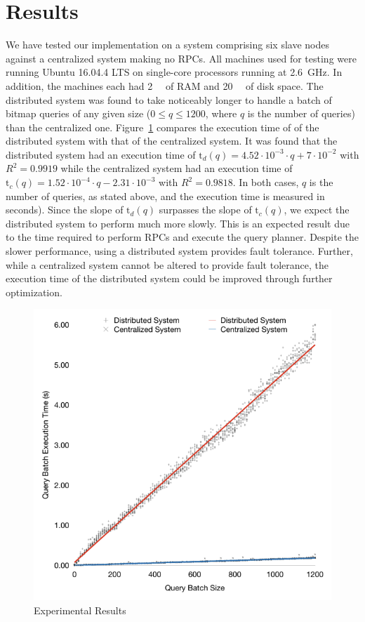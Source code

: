 \section{Results}
We have tested our implementation on a system comprising six slave nodes
against a centralized system making no RPCs. All machines used for testing were
running Ubuntu 16.04.4 LTS on single-core processors running at
\SI{2.6}{\giga\hertz}. In addition, the machines each had \SI{2}{\gibi\byte}
of RAM and \SI{20}{\gibi\byte} of disk space. The distributed system was found
to take noticeably longer to handle a batch of bitmap queries of any given size
(\(0 \leq q \leq 1200\), where \(q\) is the number of queries) than the
centralized one. Figure~\ref{fig:graph-of-results} compares the execution time
of of the distributed system with that of the centralized system. It was found
that the distributed system had an execution time of
\(\mathrm{t}_d(q) = 4.52 \cdot 10^{-3} \cdot q + 7 \cdot 10^{-2}\)
with \(R^2 = 0.9919\) while the centralized system had an execution time of
\(\mathrm{t}_c(q) = 1.52 \cdot 10^{-4} \cdot q - 2.31 \cdot 10^{-3}\)
with \(R^2 = 0.9818\). In both cases, \(q\) is the number of queries, as stated
above, and the execution time is measured in seconds). Since the slope of
\(\mathrm{t}_d(q)\) surpasses the slope of \(\mathrm{t}_c(q)\), we expect the
distributed system to perform much more slowly. This is an expected result due
to the time required to perform RPCs and execute the query planner. Despite the
slower performance, using a distributed system provides fault tolerance.
Further, while a centralized system cannot be altered to provide fault
tolerance, the execution time of the distributed system could be improved
through further optimization.
%
\begin{figure}
    \centering
    \includegraphics[width=\columnwidth]{query-experiment-results}
    \caption{Experimental Results}\label{fig:graph-of-results}
\end{figure}
